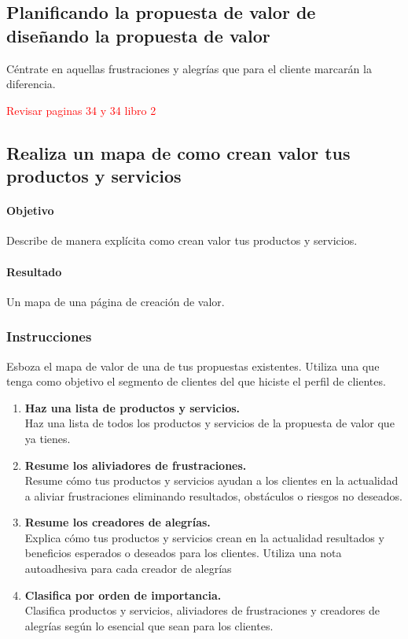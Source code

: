 \documentclass[11pt]{book}
\begin{document}
\subsection{Planificando la propuesta de valor de diseñando la propuesta de valor}
Céntrate en aquellas frustraciones y alegrías que para el cliente marcarán la diferencia.

\textcolor{red}{Revisar paginas 34 y 34 libro 2}

\subsection{Realiza un mapa de como crean valor tus productos y servicios}
\paragraph{Objetivo}
Describe de manera explícita como crean valor tus productos y servicios.
\paragraph{Resultado}
Un mapa de una página de creación de valor.
\subsubsection{Instrucciones}
Esboza el mapa de valor de una de tus propuestas existentes. Utiliza una que tenga como objetivo el segmento de clientes del que hiciste el perfil de clientes.
\begin{enumerate}
\item \textbf{Haz una lista de productos y servicios.} \\
Haz una lista de todos los productos y servicios de la propuesta de valor que ya tienes.
\item \textbf{Resume los aliviadores de frustraciones.} \\
Resume cómo tus productos y servicios ayudan a los clientes en la actualidad a aliviar frustraciones eliminando resultados, obstáculos o riesgos no deseados.
\item \textbf{Resume los creadores de alegrías.}\\
Explica cómo tus productos y servicios crean en la actualidad resultados y beneficios esperados o deseados para los clientes. Utiliza una nota autoadhesiva para cada creador de alegrías
\item \textbf{Clasifica por orden de importancia.}\\
Clasifica productos y servicios, aliviadores de frustraciones y creadores de alegrías según lo esencial que sean para los clientes.
\end{enumerate}
\end{document}
